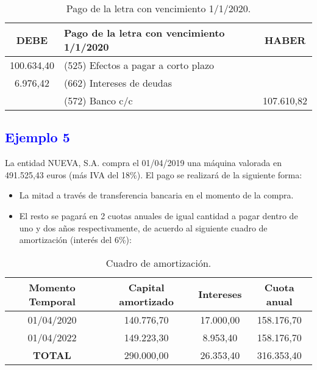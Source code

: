 \begin{table}[H]
    \centering
    \begin{tabular}{|c|p{8cm}|c|}
        \hline
        \rowcolor{blue!30}
        \textbf{DEBE} & \textbf{Pago de la letra con vencimiento 1/1/2020} & \textbf{HABER} \\
        \hline
        100.634,40 & (525) Efectos a pagar a corto plazo & \\
        \hline
        6.976,42 & (662) Intereses de deudas & \\
        \hline
        & (572) Banco c/c & 107.610,82 \\
        \hline
    \end{tabular}
    \caption{Pago de la letra con vencimiento 1/1/2020.}
    \label{tabla:pago_letra_2020}
\end{table}

\newpage
\subsection*{\textcolor{blue}{Ejemplo 5}}

La entidad NUEVA, S.A. compra el 01/04/2019 una máquina valorada en 491.525,43 euros (más IVA del 18\%). El pago se realizará de la siguiente forma:
\begin{itemize}
    \item La mitad a través de transferencia bancaria en el momento de la compra.
    \item El resto se pagará en 2 cuotas anuales de igual cantidad a pagar dentro de uno y dos años respectivamente, de acuerdo al siguiente cuadro de amortización (interés del 6\%):
\end{itemize}

\begin{table}[H]
    \centering
    \begin{tabular}{|c|c|c|c|}
        \hline
        \rowcolor{blue!30}
        \textbf{Momento Temporal} & \textbf{Capital amortizado} & \textbf{Intereses} & \textbf{Cuota anual} \\
        \hline
        01/04/2020 & 140.776,70 & 17.000,00 & 158.176,70 \\
        \hline
        01/04/2022 & 149.223,30 & 8.953,40 & 158.176,70 \\
        \hline
        \textbf{TOTAL} & 290.000,00 & 26.353,40 & 316.353,40 \\
        \hline
    \end{tabular}
    \caption{Cuadro de amortización.}
    \label{tabla:cuadro_amortizacion_ej5}
\end{table}


